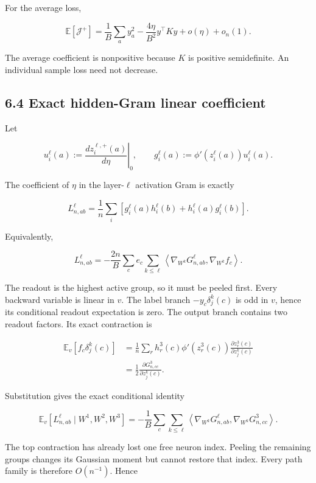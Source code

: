 For the average loss,

\[
\boxed{
\mathbb E[\mathcal J^+]
=
\frac1B\sum_a y_a^2
-\frac{4\eta}{B^2}y^\top Ky
+o(\eta)+o_n(1).
}
\]


The average coefficient is nonpositive because \(K\) is positive
semidefinite. An individual sample loss need not decrease.

\subsection*{6.4 Exact hidden-Gram linear coefficient}


Let

\[
u_i^\ell(a)
:=
\left.\frac{dz_i^{\ell,+}(a)}{d\eta}\right|_0,
\qquad
g_i^\ell(a)
:=
\phi'(z_i^\ell(a))u_i^\ell(a).
\]


The coefficient of \(\eta\) in the layer-\(\ell\) activation Gram is exactly

\[
L^\ell_{n,ab}
=
\frac1n\sum_i
\left[
g_i^\ell(a)h_i^\ell(b)
+h_i^\ell(a)g_i^\ell(b)
\right].
\]


Equivalently,

\[
L^\ell_{n,ab}
=
-\frac{2n}{B}\sum_c e_c
\sum_{k\leq\ell}
\left\langle
\nabla_{W^k}G^\ell_{n,ab},
\nabla_{W^k}f_c
\right\rangle.
\]


The readout is the highest active group, so it must be peeled first. Every
backward variable is linear in \(v\). The label branch
\(-y_c\delta_j^k(c)\) is odd in \(v\), hence its conditional readout
expectation is zero. The output branch contains two readout factors. Its exact
contraction is

\[
\begin{aligned}
\mathbb E_v[f_c\delta_j^k(c)]
&=
\frac1n\sum_r
h_r^3(c)\phi'(z_r^3(c))
\frac{\partial z_r^3(c)}{\partial z_j^k(c)}
\\
&=
\frac12
\frac{\partial G^3_{n,cc}}{\partial z_j^k(c)}.
\end{aligned}
\]


Substitution gives the exact conditional identity

\[
\boxed{
\mathbb E_v[L^\ell_{n,ab}\mid W^1,W^2,W^3]
=
-\frac1B\sum_c\sum_{k\leq\ell}
\left\langle
\nabla_{W^k}G^\ell_{n,ab},
\nabla_{W^k}G^3_{n,cc}
\right\rangle.
}
\]


The top contraction has already lost one free neuron index. Peeling the
remaining groups changes its Gaussian moment but cannot restore that index.
Every path family is therefore \(O(n^{-1})\). Hence

